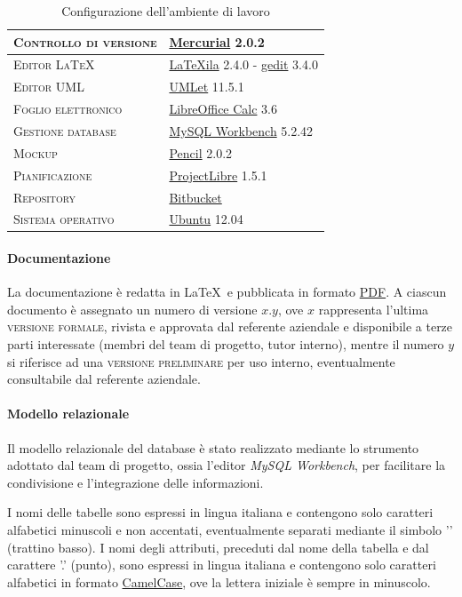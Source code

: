 \begin{table}[ht]
\centering
\begin{tabular}{|l|l|}
\hline
\textsc{Controllo di versione} & \underline{Mercurial} 2.0.2 \\ \hline
\textsc{Editor \LaTeX} & \underline{LaTeXila} 2.4.0 - \underline{gedit} 3.4.0\\ \hline
\textsc{Editor UML} & \underline{UMLet} 11.5.1 \\ \hline
\textsc{Foglio elettronico} & \underline{LibreOffice Calc} 3.6 \\ \hline
\textsc{Gestione database} & \underline{MySQL Workbench} 5.2.42 \\ \hline
\textsc{Mockup} & \underline{Pencil} 2.0.2 \\	\hline
\textsc{Pianificazione} & \underline{ProjectLibre} 1.5.1 \\ \hline
\textsc{Repository} & \underline{Bitbucket} \\ \hline
\textsc{Sistema operativo} & \underline{Ubuntu} 12.04 \\ \hline
\end{tabular}
\caption{Configurazione dell'ambiente di lavoro}
\label{tab:tesi:stage:norme:strumenti}
\end{table}

\paragraph{Documentazione}
La documentazione è redatta in \LaTeX\ e pubblicata in formato \underline{PDF}. A ciascun documento è assegnato un numero di versione $x.y$, ove $x$ rappresenta l'ultima \textsc{versione formale}, rivista e approvata dal referente aziendale e disponibile a terze parti interessate (membri del team di progetto, tutor interno), mentre il numero $y$ si riferisce ad una \textsc{versione preliminare} per uso interno, eventualmente consultabile dal referente aziendale.

\paragraph{Modello relazionale}
Il modello relazionale del database è stato realizzato mediante lo strumento adottato dal team di progetto, ossia l'editor \textit{MySQL Workbench}, per facilitare la condivisione e l'integrazione delle informazioni.

I nomi delle tabelle sono espressi in lingua italiana e contengono solo caratteri alfabetici minuscoli e non accentati, eventualmente separati mediante il simbolo '\textunderscore' (trattino basso). I nomi degli attributi, preceduti dal nome della tabella e dal carattere '.' (punto), sono espressi in lingua italiana e contengono solo caratteri alfabetici in formato \underline{CamelCase}, ove la lettera iniziale è sempre in minuscolo.

